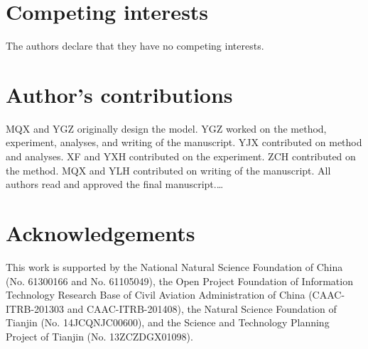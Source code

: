 \documentclass{bmcart}
\begin{document}
\begin{backmatter}

\section*{Competing interests}
The authors declare that they have no competing interests.

\section*{Author's contributions}
MQX and YGZ originally design the model. YGZ worked on the method, experiment, analyses, and writing of the manuscript. YJX  contributed on method and analyses.  XF and YXH contributed on the experiment. ZCH contributed on the method. MQX and YLH contributed on writing of the manuscript. All authors read and approved the final manuscript.\ldots

\section*{Acknowledgements}
This work is supported by the National Natural Science Foundation of China (No. 61300166 and No. 61105049), the Open Project Foundation of Information Technology Research Base of Civil Aviation Administration of China (CAAC-ITRB-201303 and CAAC-ITRB-201408), the Natural Science Foundation of Tianjin (No. 14JCQNJC00600), and the Science and Technology Planning Project of Tianjin (No. 13ZCZDGX01098).




\end{backmatter}
\end{document}
